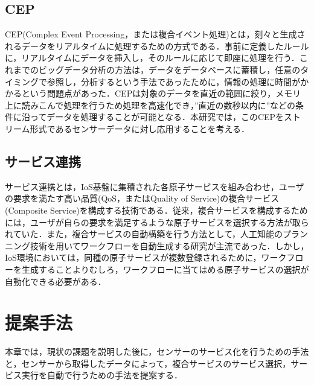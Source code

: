 \documentclass{kuisthesis}			%
\begin{document}
\subsection{CEP}
CEP(Complex Event Processing，または複合イベント処理)とは，刻々と生成されるデータをリアルタイムに処理するための方式である．事前に定義したルールに，リアルタイムにデータを挿入し，そのルールに応じて即座に処理を行う．これまでのビッグデータ分析の方法は，データをデータベースに蓄積し，任意のタイミングで参照し，分析するという手法であったために，情報の処理に時間がかかるという問題点があった．CEPは対象のデータを直近の範囲に絞り，メモリ上に読みこんで処理を行うため処理を高速化でき，”直近の数秒以内に”などの条件に沿ってデータを処理することが可能となる．本研究では，このCEPをストリーム形式であるセンサーデータに対し応用することを考える．

\subsection{サービス連携}
サービス連携とは，IoS基盤に集積された各原子サービスを組み合わせ，ユーザの要求を満たす高い品質(QoS，またはQuality of Service)の複合サービス(Composite Service)を構成する技術である．従来，複合サービスを構成するためには，ユーザが自らの要求を満足するような原子サービスを選択する方法が取られていた．また，複合サービスの自動構築を行う方法として，人工知能のプランニング技術を用いてワークフローを自動生成する研究が主流であった．しかし，IoS環境においては，同種の原子サービスが複数登録されるために，ワークフローを生成することよりむしろ，ワークフローに当てはめる原子サービスの選択が自動化できる必要がある．


\section{提案手法}
本章では，現状の課題を説明した後に，センサーのサービス化を行うための手法と，センサーから取得したデータによって，複合サービスのサービス選択，サービス実行を自動で行うための手法を提案する．
\end{document}
